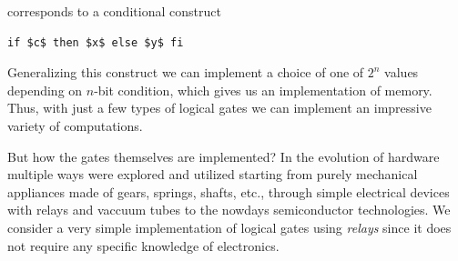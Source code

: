 corresponds to a conditional construct

\begin{lstlisting}[mathescape=true]
    if $c$ then $x$ else $y$ fi
\end{lstlisting}

Generalizing this construct we can implement a choice of one of $2^n$ values depending on $n$-bit condition, which
gives us an implementation of memory. Thus, with just a few types of logical gates we can implement an impressive
variety of computations.

But how the gates themselves are implemented? In the evolution of hardware multiple ways were explored and utilized
starting from purely mechanical appliances made of gears, springs, shafts, etc., through simple electrical
devices with relays and vaccuum tubes to the nowdays semiconductor technologies. We consider a very simple implementation
of logical gates using \emph{relays} since it does not require any specific knowledge of electronics.

